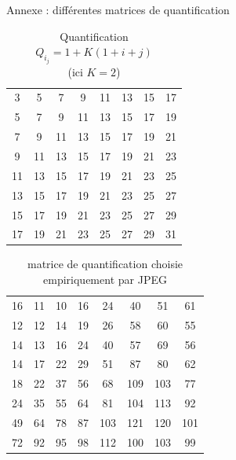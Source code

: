 \documentclass[xcolor=dvipsnames]{beamer}
\begin{document}
\begin{frame} {Annexe : différentes matrices de quantification}
\begin{minipage}{0.3\textwidth}
\begin{table}
                  \begin{tabular}{cccccccc}
                3 & 5 & 7 & 9 & 11 & 13 & 15 & 17\\
                5 & 7 & 9 & 11 & 13 & 15 & 17 & 19\\
                7 & 9 & 11 & 13 & 15 & 17 & 19 & 21\\
                9 & 11 & 13 & 15 & 17 & 19 & 21 & 23\\
                11 & 13 & 15 & 17 & 19 & 21 & 23 & 25\\
                13 & 15 & 17 & 19 & 21 & 23 & 25 & 27\\
                15 & 17 & 19 & 21 & 23 & 25 & 27 & 29\\
                17 & 19 & 21 & 23 & 25 & 27 & 29 & 31\\
            \end{tabular}
            \caption{\centering Quantification $Q_i_j = 1 + K(1 + i + j)$ \\ (ici $K = 2$)}
        \end{table}
    \end{minipage}
    \hfill
    \begin{minipage}{0.3\textwidth}
        \centering
        \begin{table}
            \tiny 
            \centering
            \renewcommand{\arraystretch}{1.1} %
    
            \setlength{\tabcolsep}{2pt} %
            \begin{tabular}{cccccccc}
                16 & 11 & 10 & 16 & 24 & 40 & 51 & 61\\
                12 & 12 & 14 & 19 & 26 & 58 & 60 & 55\\
                14 & 13 & 16 & 24 & 40 & 57 & 69 & 56\\
                14 & 17 & 22 & 29 & 51 & 87 & 80 & 62\\
                18 & 22 & 37 & 56 & 68 & 109 & 103 & 77\\
                24 & 35 & 55 & 64 & 81 & 104 & 113 & 92\\
                49 & 64 & 78 & 87 & 103 & 121 & 120 & 101\\
                72 & 92 & 95 & 98 & 112 & 100 & 103 & 99\\
            \end{tabular}
            \caption{\centering matrice de quantification choisie empiriquement par JPEG} %
        \end{table}
    \end{minipage}
    \hfill

\end{frame}
\end{document}
